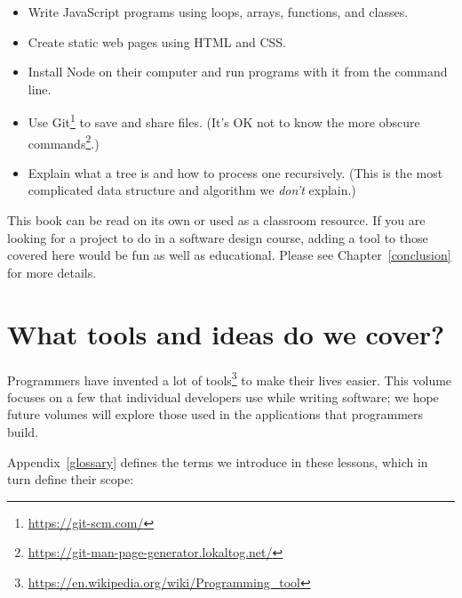 \documentclass[krantzl]{krantz}
\newcommand{\appref}[1]{Appendix~\ref{#1}}
\newcommand{\chapref}[1]{Chapter~\ref{#1}}
\newcommand{\hreffoot}[2]{{#1}\footnote{\href{#2}{#2}}}
\begin{document}
\begin{itemize}

\item 

Write JavaScript programs using loops, arrays, functions, and classes.



\item 

Create static web pages using HTML and CSS.



\item 

Install Node on their computer
    and run programs with it from the command line.



\item 

Use \hreffoot{Git}{https://git-scm.com/} to save and share files.
    (It’s OK not to know \hreffoot{the more obscure commands}{https://git-man-page-generator.lokaltog.net/}.)



\item 

Explain what a tree is and how to process one recursively.
    (This is the most complicated data structure and algorithm we \emph{don’t} explain.)



\end{itemize}


This book can be read on its own or used as a classroom resource.
If you are looking for a project to do in a software design course,
adding a tool to those covered here would be fun as well as educational.
Please see \chapref{conclusion} for more details.

\section{What tools and ideas do we cover?}\label{introduction-contents}


Programmers have invented \hreffoot{a lot of tools}{https://en.wikipedia.org/wiki/Programming\_tool} to make their lives easier.
This volume focuses on a few that individual developers use while writing software;
we hope future volumes
will explore those used in the applications that programmers build.


\appref{glossary} defines the terms we introduce in these lessons,
which in turn define their scope:
\end{document}

